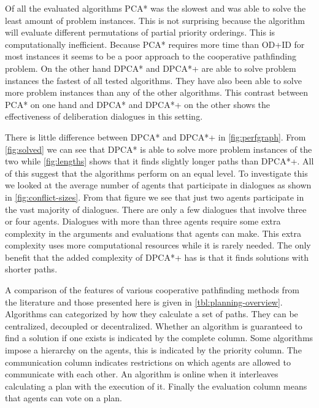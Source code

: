 Of all the evaluated algorithms PCA* was the slowest and was able to solve the 
least amount of problem instances. This is not surprising because the algorithm 
will evaluate different permutations of partial priority orderings. This is 
computationally inefficient. Because PCA* requires more time than OD+ID for 
most instances it seems to be a poor approach to the cooperative pathfinding 
problem. On the other hand  DPCA* and DPCA*+ are able to solve problem 
instances the fastest of all tested algorithms. They have also been able to 
solve more problem instances than any of the other algorithms. This contrast 
between PCA* on one hand and DPCA* and DPCA*+ on the other shows the 
effectiveness of deliberation dialogues in this setting.

There is little difference between DPCA* and DPCA*+ in \autoref{fig:perfgraph}. 
From \autoref{fig:solved} we can see that DPCA* is able to solve more problem 
instances of the two while \autoref{fig:lengths} shows that it finds slightly 
longer paths than DPCA*+. All of this suggest that the algorithms perform on an 
equal level. To investigate this we looked at the average number of agents that 
participate in dialogues as shown in \autoref{fig:conflict-sizes}. From that 
figure we see that just two agents participate in the vast majority of 
dialogues. There are only a few dialogues that involve three or four agents.
Dialogues with more than three agents require some extra complexity in the 
arguments and evaluations that agents can make. This extra complexity uses more 
computational resources while it is rarely needed. The only benefit that the 
added complexity of DPCA*+ has is that it finds solutions with shorter paths.

A comparison of the features of various cooperative pathfinding methods from 
the literature and those presented here is given in 
\autoref{tbl:planning-overview}. Algorithms can categorized by how  they 
calculate a set of paths. They can be centralized, decoupled or decentralized. 
Whether an algorithm is guaranteed to find a solution if one exists is 
indicated by the complete column. Some algorithms impose a hierarchy on the 
agents, this is indicated by the priority column. The communication column 
indicates restrictions on which agents are allowed to communicate with each 
other. An algorithm is online when it interleaves calculating a plan with the 
execution of it. Finally the evaluation column means that agents can vote on a 
plan.